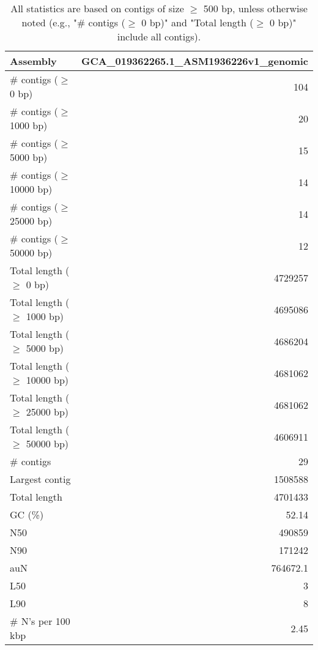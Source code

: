 \documentclass[12pt,a4paper]{article}
\begin{document}
\begin{table}[ht]
\begin{center}
\caption{All statistics are based on contigs of size $\geq$ 500 bp, unless otherwise noted (e.g., "\# contigs ($\geq$ 0 bp)" and "Total length ($\geq$ 0 bp)" include all contigs).}
\begin{tabular}{|l*{1}{|r}|}
\hline
Assembly & GCA\_019362265.1\_ASM1936226v1\_genomic \\ \hline
\# contigs ($\geq$ 0 bp) & 104 \\ \hline
\# contigs ($\geq$ 1000 bp) & 20 \\ \hline
\# contigs ($\geq$ 5000 bp) & 15 \\ \hline
\# contigs ($\geq$ 10000 bp) & 14 \\ \hline
\# contigs ($\geq$ 25000 bp) & 14 \\ \hline
\# contigs ($\geq$ 50000 bp) & 12 \\ \hline
Total length ($\geq$ 0 bp) & 4729257 \\ \hline
Total length ($\geq$ 1000 bp) & 4695086 \\ \hline
Total length ($\geq$ 5000 bp) & 4686204 \\ \hline
Total length ($\geq$ 10000 bp) & 4681062 \\ \hline
Total length ($\geq$ 25000 bp) & 4681062 \\ \hline
Total length ($\geq$ 50000 bp) & 4606911 \\ \hline
\# contigs & 29 \\ \hline
Largest contig & 1508588 \\ \hline
Total length & 4701433 \\ \hline
GC (\%) & 52.14 \\ \hline
N50 & 490859 \\ \hline
N90 & 171242 \\ \hline
auN & 764672.1 \\ \hline
L50 & 3 \\ \hline
L90 & 8 \\ \hline
\# N's per 100 kbp & 2.45 \\ \hline
\end{tabular}
\end{center}
\end{table}
\end{document}
